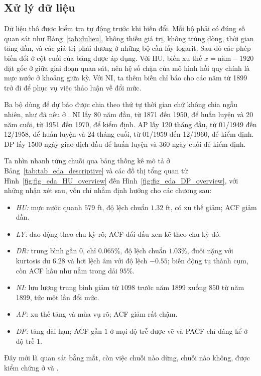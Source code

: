 \subsection{Xử lý dữ liệu}

Dữ liệu thô được kiểm tra tự động trước khi biến đổi. Mỗi bộ phải có đúng số quan sát như Bảng~\ref{tab:dulieu}, không thiếu giá trị, không trùng dòng, thời gian tăng dần, và các giá trị phải dương ở những bộ cần lấy logarit. Sau đó các phép biến đổi ở cột cuối của bảng được áp dụng. Với HU, biến xu thế $x=\text{năm}-1920$ đặt gốc ở giữa giai đoạn quan sát, nên hệ số chặn của mô hình hồi quy chính là mực nước ở khoảng giữa kỳ. Với NI, ta thêm biến chỉ báo cho các năm từ 1899 trở đi để phục vụ việc thảo luận về đổi mức.

Ba bộ dùng để dự báo được chia theo thứ tự thời gian chứ không chia ngẫu nhiên, như đã nêu ở . NI lấy 80 năm đầu, từ 1871 đến 1950, để huấn luyện và 20 năm cuối, từ 1951 đến 1970, để kiểm định. AP lấy 120 tháng đầu, từ 01/1949 đến 12/1958, để huấn luyện và 24 tháng cuối, từ 01/1959 đến 12/1960, để kiểm định. DP lấy 1500 ngày giao dịch đầu để huấn luyện và 360 ngày cuối để kiểm định.

Ta nhìn nhanh từng chuỗi qua bảng thống kê mô tả ở Bảng~\ref{tab:tab_eda_descriptive} và các đồ thị tổng quan từ Hình~\ref{fig:fig_eda_HU_overview} đến Hình~\ref{fig:fig_eda_DP_overview}, với những nhận xét sau, vốn chỉ nhằm định hướng cho các chương sau:
\begin{itemize}[leftmargin=*,itemsep=1pt]
\item \emph{HU:} mực nước quanh $579$ ft, độ lệch chuẩn $1.32$ ft, có xu thế giảm; ACF giảm dần.
\item \emph{LY:} dao động theo chu kỳ rõ; ACF đổi dấu xen kẽ theo chu kỳ đó.
\item \emph{DR:} trung bình gần $0$, chỉ $0.065\%$, độ lệch chuẩn $1.03\%$, đuôi nặng với kurtosis dư $6.28$ và hơi lệch âm với độ lệch $-0.55$; biến động tụ thành cụm, còn ACF hầu như nằm trong dải $95\%$.
\item \emph{NI:} lưu lượng trung bình giảm từ $1098$ trước năm 1899 xuống $850$ từ năm 1899, tức một lần đổi mức.
\item \emph{AP:} xu thế tăng và mùa vụ rõ; ACF giảm rất chậm.
\item \emph{DP:} tăng dài hạn; ACF gần $1$ ở mọi độ trễ được vẽ và PACF chỉ đáng kể ở độ trễ $1$.
\end{itemize}
Đây mới là quan sát bằng mắt, còn việc chuỗi nào dừng, chuỗi nào không, được kiểm chứng ở  và .

